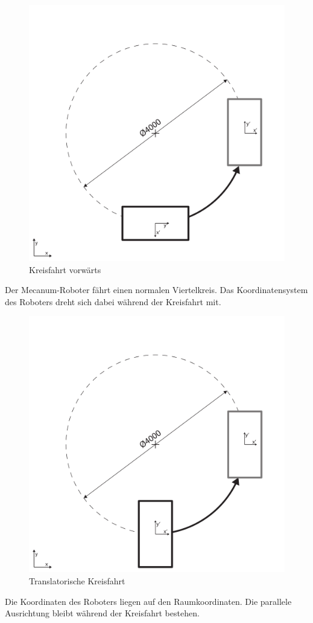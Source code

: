 \documentclass[a4paper]{article}
\begin{document}
\begin{figure}[H]
    \centering
    \includegraphics[width=.6\textwidth]{Viertelkreis-vorwaerts}
    \caption{Kreisfahrt vorwärts}
    \label{fig:kreis-vorwaerts}
\end{figure}
Der Mecanum-Roboter fährt einen normalen Viertelkreis. Das Koordinatensystem des Roboters dreht sich dabei während der Kreisfahrt mit.

\begin{figure}[H]
    \centering
    \includegraphics[width=.6\textwidth]{Viertelkreis-translatorisch}
    \caption{Translatorische Kreisfahrt}
    \label{fig:kreis-translatorisch}
\end{figure}
Die Koordinaten des Roboters liegen auf den Raumkoordinaten. Die parallele Ausrichtung bleibt während der Kreisfahrt bestehen.
\end{document}
